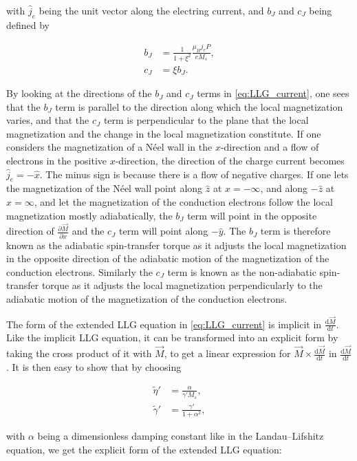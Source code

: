 \documentclass[1p]{elsarticle}		%
\numberwithin{equation}{section}
\begin{document}
with $\hat{j}_e$ being the unit vector along the electring current, and $b_J$ and $c_J$ being defined by

\begin{align}
\label{eq:bJ} b_J &= \frac{1}{1+\xi^2} \frac{\mu_B j_e P}{e M_s}, \\
c_J &= \xi b_J.
\end{align}

By looking at the directions of the $b_J$ and $c_J$ terms in \eqref{eq:LLG_current}, one sees that the $b_J$ term is parallel to the direction along which the local magnetization varies, and that the $c_J$ term is perpendicular to the plane that the local magnetization and the change in the local magnetization constitute. If one considers the magnetization of a N\'{e}el wall in the $x$-direction and a flow of electrons in the positive $x$-direction, the direction of the charge current becomes $\hat{j}_e = -\hat{x}$. The minus sign is because there is a flow of negative charges. If one lets the magnetization of the N\'{e}el wall point along $\hat{z}$ at $x = -\infty$, and along $-\hat{z}$ at $x = \infty$, and let the magnetization of the conduction electrons follow the local magnetization mostly adiabatically, the $b_J$ term will point in the opposite direction of $\frac{\partial \vec{M}}{\partial x}$ and the $c_J$ term will point along $-\hat{y}$. The $b_J$ term is therefore known as the adiabatic spin-transfer torque as it adjusts the local magnetization in the opposite direction of the adiabatic motion of the magnetization of the conduction electrons. Similarly the $c_J$ term is known as the non-adiabatic spin-transfer torque as it adjusts the local magnetization perpendicularly to the adiabatic motion of the magnetization of the conduction electrons. 

The form of the extended LLG equation in \eqref{eq:LLG_current} is implicit in $\frac{\textrm{d} \vec{M}}{\textrm{d} t}$. Like the implicit LLG equation, it can be transformed into an explicit form by taking the cross product of it with $\vec{M}$, to get a linear expression for $\vec{M}\times\frac{\textrm{d} \vec{M}}{\textrm{d} t}$ in $\frac{\textrm{d} \vec{M}}{\textrm{d} t}$. It is then easy to show that by choosing

\begin{align}
\tilde{\eta}' &= \frac{\alpha}{\gamma ' M_s}, \\
\tilde{\gamma}' &= \frac{\gamma '}{1+\alpha^2},
\end{align}

with $\alpha$ being a dimensionless damping constant like in the Landau--Lifshitz equation, we get the explicit form of the extended LLG equation:
\end{document}

